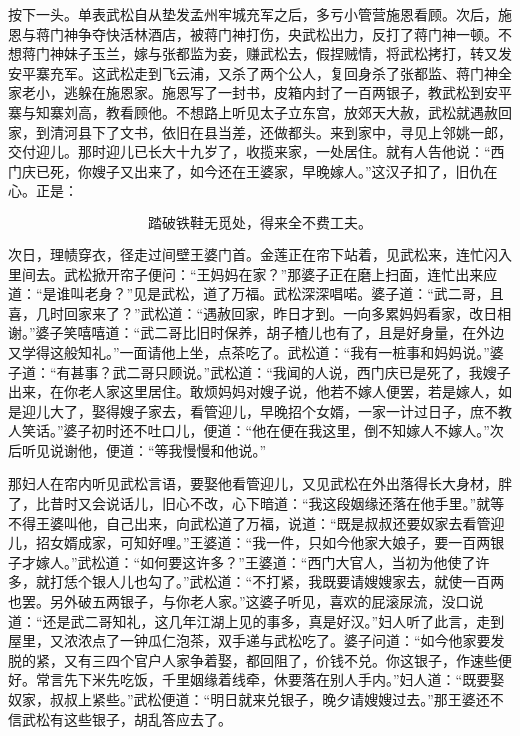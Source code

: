 按下一头。单表武松自从垫发孟州牢城充军之后，多亏小管营施恩看顾。次后，施恩与蒋门神争夺快活林酒店，被蒋门神打伤，央武松出力，反打了蒋门神一顿。不想蒋门神妹子玉兰，嫁与张都监为妾，赚武松去，假捏贼情，将武松拷打，转又发安平寨充军。这武松走到飞云浦，又杀了两个公人，复回身杀了张都监、蒋门神全家老小，逃躲在施恩家。施恩写了一封书，皮箱内封了一百两银子，教武松到安平寨与知寨刘高，教看顾他。不想路上听见太子立东宫，放郊天大赦，武松就遇赦回家，到清河县下了文书，依旧在县当差，还做都头。来到家中，寻见上邻姚一郎，交付迎儿。那时迎儿已长大十九岁了，收揽来家，一处居住。就有人告他说：“西门庆已死，你嫂子又出来了，如今还在王婆家，早晚嫁人。”这汉子扣了，旧仇在心。正是：

\[
踏破铁鞋无觅处，得来全不费工夫。
\]

次日，理帻穿衣，径走过间壁王婆门首。金莲正在帘下站着，见武松来，连忙闪入里间去。武松掀开帘子便问：“王妈妈在家？”那婆子正在磨上扫面，连忙出来应道：“是谁叫老身？”见是武松，道了万福。武松深深唱喏。婆子道：“武二哥，且喜，几时回家来了？”武松道：“遇赦回家，昨日才到。一向多累妈妈看家，改日相谢。”婆子笑嘻嘻道：“武二哥比旧时保养，胡子楂儿也有了，且是好身量，在外边又学得这般知礼。”一面请他上坐，点茶吃了。武松道：“我有一桩事和妈妈说。”婆子道：“有甚事？武二哥只顾说。”武松道：“我闻的人说，西门庆已是死了，我嫂子出来，在你老人家这里居住。敢烦妈妈对嫂子说，他若不嫁人便罢，若是嫁人，如是迎儿大了，娶得嫂子家去，看管迎儿，早晚招个女婿，一家一计过日子，庶不教人笑话。”婆子初时还不吐口儿，便道：“他在便在我这里，倒不知嫁人不嫁人。”次后听见说谢他，便道：“等我慢慢和他说。”

那妇人在帘内听见武松言语，要娶他看管迎儿，又见武松在外出落得长大身材，胖了，比昔时又会说话儿，旧心不改，心下暗道：“我这段姻缘还落在他手里。”就等不得王婆叫他，自己出来，向武松道了万福，说道：“既是叔叔还要奴家去看管迎儿，招女婿成家，可知好哩。”王婆道：“我一件，只如今他家大娘子，要一百两银子才嫁人。”武松道：“如何要这许多？”王婆道：“西门大官人，当初为他使了许多，就打恁个银人儿也勾了。”武松道：“不打紧，我既要请嫂嫂家去，就使一百两也罢。另外破五两银子，与你老人家。”这婆子听见，喜欢的屁滚尿流，没口说道：“还是武二哥知礼，这几年江湖上见的事多，真是好汉。”妇人听了此言，走到屋里，又浓浓点了一钟瓜仁泡茶，双手递与武松吃了。婆子问道：“如今他家要发脱的紧，又有三四个官户人家争着娶，都回阻了，价钱不兑。你这银子，作速些便好。常言先下米先吃饭，千里姻缘着线牵，休要落在别人手内。”妇人道：“既要娶奴家，叔叔上紧些。”武松便道：“明日就来兑银子，晚夕请嫂嫂过去。”那王婆还不信武松有这些银子，胡乱答应去了。

